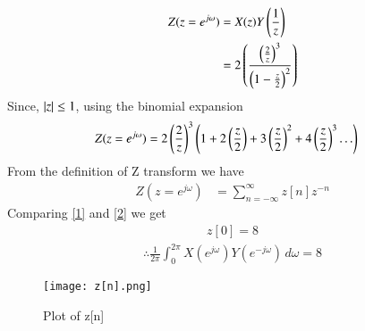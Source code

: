\documentclass[journal,12pt,twocolumn]{IEEEtran}
\begin{document}
\begin{align}
  Z(z=e^{j\omega})&= X(z) Y\left(\frac{1}{z}\right) \\
  &=2\left(\frac {\left(\frac{2}{z}\right)^3} {\left(1-\frac{z}{2}\right)^2}\right)
\end{align}
Since, $\vert z\vert\leq 1$, using the binomial expansion
\begin{align}
  Z(z=e^{j\omega})&=2 \left(\frac{2}{z}\right)^3\left(1+2\left(\frac{z}{2}\right)+3\left(\frac{z}{2}\right)^2+4\left(\frac{z}{2}\right)^3 \ldots\right)\label{1}
\end{align}
From the definition of Z transform we have
\begin{align}
 Z(z=e^{j\omega})&=  \sum _{n=-\infty }^{\infty }z[n]z^{-n}\label{2}
\end{align}
Comparing \eqref{1} and \eqref{2} we get
\begin{align}
    z[0]=8
\end{align}
\begin{align}
    \therefore \frac{1}{2\pi} \int_{0}^{2\pi} X(e^{j\omega}) Y(e^{-j\omega}) \, d\omega =8
\end{align}
\begin{figure}[!h]
         \centering
         \texttt{[image: z[n].png]}
         \caption{Plot of z[n]}
         \label{plot}
\end{figure}
\end{document}
